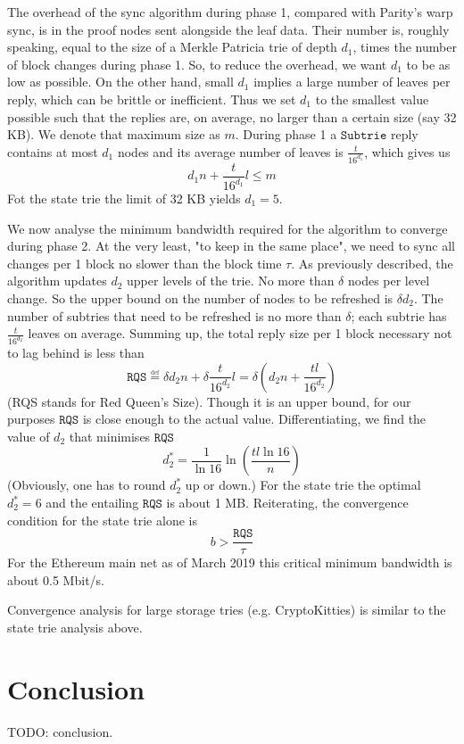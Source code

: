 \documentclass{amsart}
\begin{document}
The overhead of the sync algorithm during phase 1, compared with Parity's warp sync, is in the proof nodes sent alongside the leaf data.
Their number is, roughly speaking, equal to the size of a Merkle Patricia trie of depth $d_1$, times the number of block changes during phase 1.
So, to reduce the overhead, we want $d_1$ to be as low as possible.
On the other hand, small $d_1$ implies a large number of leaves per reply, which can be brittle or inefficient.
Thus we set $d_1$ to the smallest value possible such that the replies are, on average, no larger than a certain size (say 32 KB).
We denote that maximum size as $m$.
During phase 1 a $\texttt{Subtrie}$ reply contains at most $d_1$ nodes
and its average number of leaves is $\frac{t}{16^{d_1}}$,
which gives us
\begin{equation}
    d_1 n + \frac{t}{16^{d_1}} l \leq m
\end{equation}
Fot the state trie the limit of 32 KB yields $d_1 = 5$.

We now analyse the minimum bandwidth required for the algorithm to converge during phase 2.
At the very least, "to keep in the same place",
we need to sync all changes per 1 block no slower than the block time $\tau$.
As previously described, the algorithm updates $d_2$ upper levels of the trie.
No more than $\delta$ nodes per level change.
So the upper bound on the number of nodes to be refreshed is $\delta d_2$.
The number of subtries that need to be refreshed is no more than $\delta$;
each subtrie has $\frac{t}{16^{d_2}}$ leaves on average.
Summing up, the total reply size per 1 block necessary not to lag behind is less than
\begin{equation}
    \texttt{RQS} \overset{\underset{\mathrm{def}}{}}{=}
    \delta d_2 n + \delta \frac{t}{16^{d_2}} l =
    \delta \left ( d_2 n +  \frac{t l}{16^{d_2}} \right)
\end{equation}
(RQS stands for Red Queen's Size).
Though it is an upper bound, for our purposes $\texttt{RQS}$ is close enough to the actual value.
Differentiating, we find the value of $d_2$ that minimises $\texttt{RQS}$
\begin{equation}
    d_2^* = \frac{1}{\ln 16} \ln \left( \frac{tl \ln16}{n} \right)
\end{equation}
(Obviously, one has to round $d_2^*$ up or down.)
For the state trie the optimal $d_2^* = 6$ and the entailing $\texttt{RQS}$ is about 1 MB.
Reiterating, the convergence condition for the state trie alone is
\begin{equation}
    b > \frac{\texttt{RQS}}{\tau}
\end{equation}
For the Ethereum main net as of March 2019 this critical minimum bandwidth is about 0.5 Mbit/s.

Convergence analysis for large storage tries (e.g. CryptoKitties) is similar to the state trie analysis above.

\section{Conclusion}

TODO: conclusion.




\end{document}
